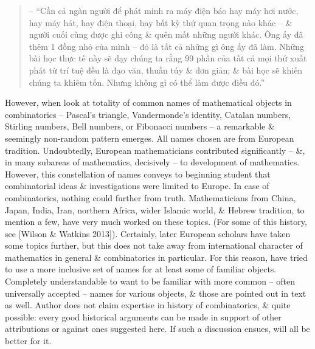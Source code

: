\documentclass{article}
\begin{document}
\begin{itemize}
\begin{itemize}
\begin{quotation}
			-- ``Cần cả ngàn người để phát minh ra máy điện báo hay máy hơi nước, hay máy hát, hay điện thoại, hay bất kỳ thứ quan trọng nào khác -- \& người cuối cùng được ghi công \& quên mất những người khác. Ông ấy đã thêm 1 đồng nhỏ của mình -- đó là tất cả những gì ông ấy đã làm. Những bài học thực tế này sẽ dạy chúng ta rằng 99 phần của tất cả mọi thứ xuất phát từ trí tuệ đều là đạo văn, thuần túy \& đơn giản; \& bài học sẽ khiến chúng ta khiêm tốn. Nhưng không gì có thể làm được điều đó.''
		\end{quotation}
		However, when look at totality of common names of mathematical objects in combinatorics -- Pascal's triangle, Vandermonde's identity, Catalan numbers, Stirling numbers, Bell numbers, or Fibonacci numbers -- a remarkable \& seemingly non-random pattern emerges. All names chosen are from European tradition. Undoubtedly, European mathematicians contributed significantly -- \&, in many subareas of mathematics, decisively -- to development of mathematics. However, this constellation of names conveys to beginning student that combinatorial ideas \& investigations were limited to Europe. In case of combinatorics, nothing could further from truth. Mathematicians from China, Japan, India, Iran, northern Africa, wider Islamic world, \& Hebrew tradition, to mention a few, have very much worked on these topics. (For some of this history, see [Wilson \& Watkins 2013]). Certainly, later European scholars have taken some topics further, but this does not take away from international character of mathematics in general \& combinatorics in particular. For this reason, have tried to use a more inclusive set of names for at least some of familiar objects. Completely understandable to want to be familiar with more common -- often universally accepted -- names for various objects, \& those are pointed out in text as well. Author does not claim expertise in history of combinatorics, \& quite possible: every good historical arguments can be made in support of other attributions or against ones suggested here. If such a discussion ensues, will all be better for it.
		

\end{itemize}
\end{itemize}
\end{document}
